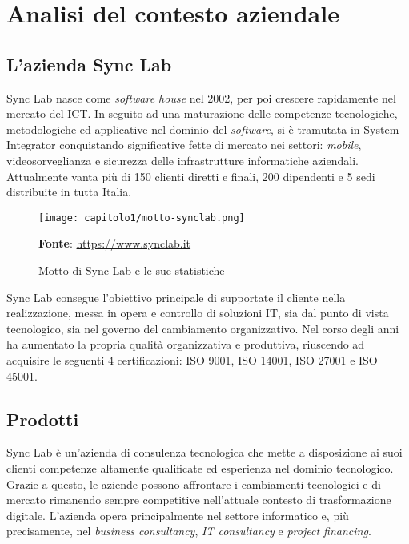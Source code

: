
\chapter{Analisi del contesto aziendale}
\label{cap:contesto-aziendale}

\section{L'azienda Sync Lab}
Sync Lab nasce come \emph{software house} nel 2002, per poi crescere rapidamente nel mercato del \gls{ICT}. In seguito ad una maturazione delle competenze tecnologiche, metodologiche ed applicative nel dominio del \emph{software}, si è tramutata in \gls{System Integrator} conquistando significative fette di mercato nei settori: \emph{mobile}, videosorveglianza e sicurezza delle infrastrutture informatiche aziendali. Attualmente vanta più di 150 clienti diretti e finali, 200 dipendenti e 5 sedi distribuite in tutta Italia. 

\begin{figure}[!h]
  \centering
  \texttt{[image: capitolo1/motto-synclab.png]}
  \caption{Motto di Sync Lab e le sue statistiche}
  \textbf{Fonte}: \href{https://www.synclab.it}{https://www.synclab.it}
\end{figure}

Sync Lab consegue l'obiettivo principale di supportate il cliente nella realizzazione, messa in opera e controllo di soluzioni IT, sia dal punto di vista tecnologico, sia nel governo del cambiamento organizzativo. Nel corso degli anni ha aumentato la propria qualità organizzativa e produttiva, riuscendo ad acquisire le seguenti 4 certificazioni: ISO 9001, ISO 14001, ISO 27001 e ISO 45001.

\section{Prodotti}
Sync Lab è un'azienda di consulenza tecnologica che mette a disposizione ai suoi clienti competenze altamente qualificate ed esperienza nel dominio tecnologico. Grazie a questo, le aziende possono affrontare i cambiamenti tecnologici e di mercato rimanendo sempre competitive nell'attuale contesto di trasformazione digitale. L'azienda opera principalmente nel settore informatico e, più precisamente, nel \emph{business consultancy}, \emph{IT consultancy} e \emph{project financing}.

